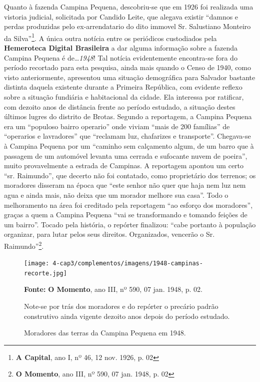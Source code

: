 Quanto à fazenda Campina Pequena, descobriu-se que em 1926 foi realizada uma vistoria judicial, solicitada por Candido Leite, que alegava existir ``damnos e perdas produzidas pelo ex-arrendatario do dito immovel Sr. Salustiano Monteiro da Silva''\footnote{\textbf{A Capital}, ano I, nº 46, 12 nov. 1926, p. 02}. A única outra notícia entre os periódicos custodiados pela \textbf{Hemeroteca Digital Brasileira} a dar alguma informação sobre a fazenda Campina Pequena é de\dots \textit{1948}! Tal notícia evidentemente encontra-se fora do período recortado para esta pesquisa, ainda mais quando o Censo de 1940, como visto anteriormente, apresentou uma situação demográfica para Salvador bastante distinta daquela existente durante a Primeira República, com evidente reflexo sobre a situação fundiária e habitacional da cidade. Ela interessa por ratificar, com dezoito anos de distância frente ao período estudado, a situação destes últimos lugres do distrito de Brotas. Segundo a reportagem, a Campina Pequena era um ``populoso bairro operario'' onde viviam ``mais de 200 famílias'' de ``operarios e lavradores'' que ``reclamam luz, chafarizes e transporte''. Chegava-se à Campina Pequena por um ``caminho sem calçamento algum, de um barro que à passagem de um automóvel levanta uma cerrada e sufocante nuvem de poeira'', muito provavelmente a estrada de Campinas. A reportagem apontou um certo ``sr. Raimundo'', que decerto não foi contatado, como proprietário dos terrenos; os moradores disseram na época que ``este senhor não quer que haja nem luz nem agua e ainda mais, não deixa que um morador melhore sua casa''. Todo o melhoramento na área foi creditado pela reportagem ``ao esforço dos moradores'', graças a quem a Campina Pequena ``vai se transformando e tomando feições de um bairro''. Tocado pela história, o repórter finalizou: ``cabe portanto à população organizar, para lutar pelos seus direitos. Organizados, vencerão o Sr. Raimundo''\footnote{\textbf{O Momento}, ano III, nº 590, 07 jan. 1948, p. 02}.


\begin{figure}[!htp]
\centering
\caption{Moradores das terras da Campina Pequena em 1948.}
\texttt{[image: 4-cap3/complementos/imagens/1948-campinas-recorte.jpg]}{\par \footnotesize \textbf{Fonte:} \textbf{O Momento}, ano III, nº 590, 07 jan. 1948, p. 02. \par Note-se por trás dos moradores e do repórter o precário padrão construtivo ainda vigente dezoito anos depois do período estudado.}
\label{fig:amaralina1928}
\end{figure}

